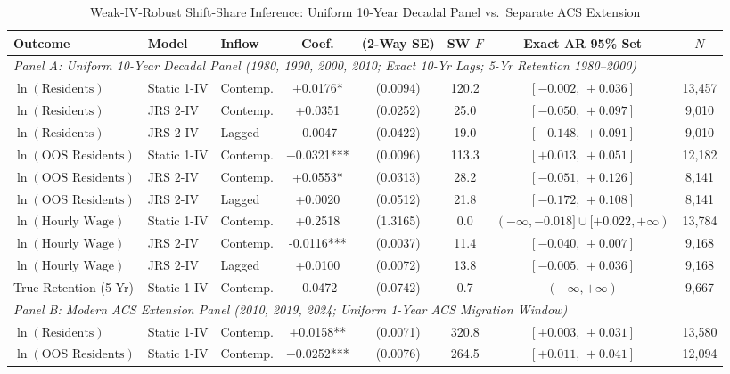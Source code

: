 \begin{table}[t!]
\centering
\caption{Weak-IV-Robust Shift-Share Inference: Uniform 10-Year Decadal Panel vs.\ Separate ACS Extension}
\label{tab:jrs_weak_iv}
\scriptsize
\setlength{\tabcolsep}{3.1pt}
\renewcommand{\arraystretch}{1.05}
\begin{tabular}{lllccccc}
\toprule
Outcome & Model & Inflow & Coef. & (2-Way SE) & SW $F$ & Exact AR 95\% Set & $N$ \\
\midrule
\multicolumn{8}{l}{\textit{Panel A: Uniform 10-Year Decadal Panel (1980, 1990, 2000, 2010; Exact 10-Yr Lags; 5-Yr Retention 1980--2000)}} \\
$\ln(\text{Residents})$ & Static 1-IV & Contemp. & +0.0176* & (0.0094) & 120.2 & $[-0.002,\,+0.036]$ & 13,457 \\
$\ln(\text{Residents})$ & JRS 2-IV & Contemp. & +0.0351 & (0.0252) & 25.0 & $[-0.050,\,+0.097]$ & 9,010 \\
$\ln(\text{Residents})$ & JRS 2-IV & Lagged & -0.0047 & (0.0422) & 19.0 & $[-0.148,\,+0.091]$ & 9,010 \\
$\ln(\text{OOS Residents})$ & Static 1-IV & Contemp. & +0.0321*** & (0.0096) & 113.3 & $[+0.013,\,+0.051]$ & 12,182 \\
$\ln(\text{OOS Residents})$ & JRS 2-IV & Contemp. & +0.0553* & (0.0313) & 28.2 & $[-0.051,\,+0.126]$ & 8,141 \\
$\ln(\text{OOS Residents})$ & JRS 2-IV & Lagged & +0.0020 & (0.0512) & 21.8 & $[-0.172,\,+0.108]$ & 8,141 \\
$\ln(\text{Hourly Wage})$ & Static 1-IV & Contemp. & +0.2518 & (1.3165) & 0.0 & $(-\infty, -0.018] \cup [+0.022, +\infty)$ & 13,784 \\
$\ln(\text{Hourly Wage})$ & JRS 2-IV & Contemp. & -0.0116*** & (0.0037) & 11.4 & $[-0.040,\,+0.007]$ & 9,168 \\
$\ln(\text{Hourly Wage})$ & JRS 2-IV & Lagged & +0.0100 & (0.0072) & 13.8 & $[-0.005,\,+0.036]$ & 9,168 \\
True Retention (5-Yr) & Static 1-IV & Contemp. & -0.0472 & (0.0742) & 0.7 & $(-\infty, +\infty)$ & 9,667 \\
\midrule
\multicolumn{8}{l}{\textit{Panel B: Modern ACS Extension Panel (2010, 2019, 2024; Uniform 1-Year ACS Migration Window)}} \\
$\ln(\text{Residents})$ & Static 1-IV & Contemp. & +0.0158** & (0.0071) & 320.8 & $[+0.003,\,+0.031]$ & 13,580 \\
$\ln(\text{OOS Residents})$ & Static 1-IV & Contemp. & +0.0252*** & (0.0076) & 264.5 & $[+0.011,\,+0.041]$ & 12,094 \\

\end{tabular}
\end{table}
